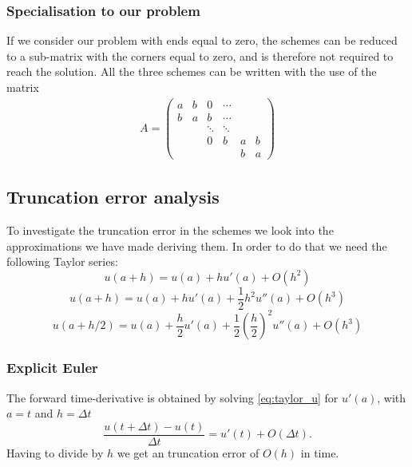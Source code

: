 \documentclass[11pt,a4paper,final]{article}
\numberwithin{equation}{section}
\begin{document}
\subsubsection{Specialisation to our problem}

If we consider our problem with ends equal to zero, the schemes can 
be reduced to a sub-matrix with the corners equal to zero, and is therefore
not required to reach the solution. All the three schemes can be written 
with the use of the matrix
\begin{gather}
A = 
\begin{pmatrix}
a & b & 0 & \cdots\\
b & a & b & \cdots\\
&&\ddots & \ddots\\
&&0& b& a & b\\
&&&&b&a
\end{pmatrix}
\label{eq:matrixA}
\end{gather}

\subsection{Truncation error analysis}

To investigate the truncation error in the schemes we look into the approximations we have made deriving them. In order to do that we need the following Taylor series:
\begin{equation}
u(a+h) = u(a) +hu'(a)+O(h^2)
\label{eq:taylor_u}
\end{equation}
\begin{equation}
u(a+h) = u(a) +hu'(a)+\frac{1}{2}h^2 u''(a) +O(h^3)
\label{eq:taylor_u2}
\end{equation}
\begin{equation}
u(a+h/2) = u(a) +\frac{h}{2}u'(a) + \frac{1}{2} \left( \frac{h}{2} \right)^2 u''(a) + O(h^3)
\label{eq:taylor_u3}
\end{equation}

\subsubsection{Explicit Euler}
The forward time-derivative is obtained by solving \eqref{eq:taylor_u}
for $u'(a)$, with $a=t$ and $h=\Delta t$
\begin{equation}
\frac{u(t+\Delta t)-u(t)}{\Delta t} = u'(t)+O(\Delta t).
\end{equation}  
Having to divide by $h$ we get an truncation error of $O(h)$ in time.
\end{document}

